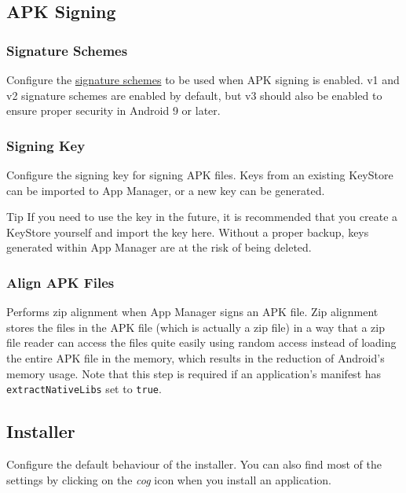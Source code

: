 \subsection{APK Signing}\label{subsec:apk-signing} %

\subsubsection{Signature Schemes} %
Configure the \href{https://source.android.com/security/apksigning}{signature schemes} to be used when APK signing is enabled.
v1 and v2 signature schemes are enabled by default, but v3 should also be enabled to ensure proper security in Android 9 or later.

\subsubsection{Signing Key} %
Configure the signing key for signing APK files. Keys from an existing KeyStore can be imported to App Manager,
or a new key can be generated.

\begin{tip}{Tip}
    If you need to use the key in the future, it is recommended that you create a KeyStore yourself
    and import the key here. Without a proper backup, keys generated within App Manager are at the risk of being deleted.
\end{tip}

\subsubsection{Align APK Files} %
Performs zip alignment when App Manager signs an APK file. Zip alignment stores the files in the APK
file (which is actually a zip file) in a way that a zip file reader can access the files quite
easily using random access instead of loading the entire APK file in the memory, which results in
the reduction of Android's memory usage. Note that this step is required if an application's
manifest has \texttt{extractNativeLibs} set to \texttt{true}.

\subsection{Installer}\label{subsec:installer} %
Configure the default behaviour of the installer. You can also find most of the settings by clicking
on the \textit{cog} icon when you install an application.


